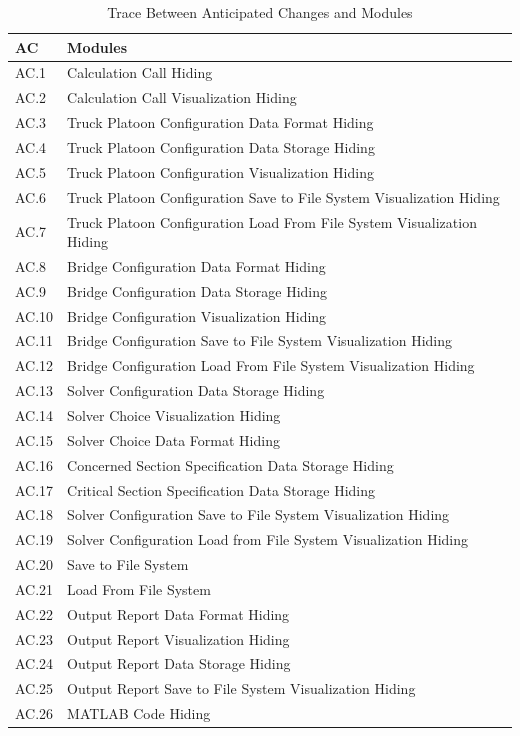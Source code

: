 \documentclass[12pt, titlepage]{article}
\begin{document}
\begin{table}[H]
\centering
\begin{tabular}{p{} p{}}
\toprule
\textbf{AC} & \textbf{Modules}\\
\midrule
AC.1 & Calculation Call Hiding \\
AC.2 & Calculation Call Visualization Hiding \\
AC.3 & Truck Platoon Configuration Data Format Hiding \\
AC.4 & Truck Platoon Configuration Data Storage Hiding \\
AC.5 & Truck Platoon Configuration Visualization Hiding\\
AC.6 & Truck Platoon Configuration Save to File System Visualization Hiding\\
AC.7 & Truck Platoon Configuration Load From File System Visualization Hiding\\
AC.8 & Bridge Configuration Data Format Hiding \\
AC.9 & Bridge Configuration Data Storage Hiding \\
AC.10 & Bridge Configuration Visualization Hiding\\
AC.11 & Bridge Configuration Save to File System Visualization Hiding\\
AC.12 & Bridge Configuration Load From File System Visualization Hiding\\
AC.13 & Solver Configuration Data Storage Hiding \\
AC.14 & Solver Choice Visualization Hiding \\
AC.15 & Solver Choice Data Format Hiding \\
AC.16 & Concerned Section Specification Data Storage Hiding \\
AC.17 & Critical Section Specification Data Storage Hiding\\
AC.18 & Solver Configuration Save to File System Visualization Hiding\\
AC.19 & Solver Configuration Load from File System Visualization Hiding\\
AC.20 & Save to File System\\
AC.21 & Load From File System\\
AC.22 & Output Report Data Format Hiding\\
AC.23 & Output Report Visualization Hiding\\
AC.24 & Output Report Data Storage Hiding\\
AC.25 & Output Report Save to File System Visualization Hiding\\
AC.26 & MATLAB Code Hiding\\

\bottomrule
\end{tabular}
\caption{Trace Between Anticipated Changes and Modules}
\label{TblACT}
\end{table}
\end{document}
